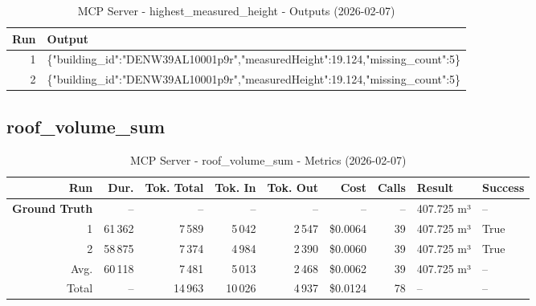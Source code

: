 \documentclass[a4paper,11pt]{article}
\begin{document}
\clearpage

\begin{table}[ht]
\centering
\scriptsize
\caption{MCP Server - highest\_measured\_height - Outputs (2026-02-07)}
\label{tab:mcp\_highest\_measured\_height\_outputs\_2026-02-07}
\begin{tabular}{r p{12cm}}
\hline
Run & Output \\
\hline
1 & \{"building\_id":"DENW39AL10001p9r","measuredHeight":19.124,"missing\_count":5\} \\
2 & \{"building\_id":"DENW39AL10001p9r","measuredHeight":19.124,"missing\_count":5\} \\
\hline
\end{tabular}
\end{table}

\clearpage
\subsection{roof\_volume\_sum}

\begin{table}[ht]
\centering
\scriptsize
\caption{MCP Server - roof\_volume\_sum - Metrics (2026-02-07)}
\label{tab:mcp\_roof\_volume\_sum\_metrics\_2026-02-07}
\begin{tabular}{r r r r r r r p{3cm} l}
\hline
Run & Dur. & Tok. Total & Tok. In & Tok. Out & Cost & Calls & Result & Success \\
\hline
\textbf{Ground Truth} & -- & -- & -- & -- & -- & -- & 407.725 m³ & -- \\
1 & 61\,362 & 7\,589 & 5\,042 & 2\,547 & \$0.0064 & 39 & 407.725 m³ & True \\
2 & 58\,875 & 7\,374 & 4\,984 & 2\,390 & \$0.0060 & 39 & 407.725 m³ & True \\
\hline
Avg. & 60\,118 & 7\,481 & 5\,013 & 2\,468 & \$0.0062 & 39 & 407.725 m³ & -- \\
Total & -- & 14\,963 & 10\,026 & 4\,937 & \$0.0124 & 78 & -- & -- \\
\hline
\end{tabular}
\end{table}

\clearpage
\end{document}
